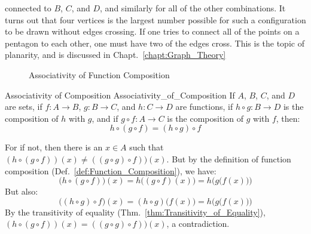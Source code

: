         connected to $B$, $C$, and $D$, and similarly for all of the other
        combinations. It turns out that four vertices is the largest number
        possible for such a configuration to be drawn without edges crossing.
        If one tries to connect all of the points on a pentagon to each other,
        one must have two of the edges cross. This is the topic of planarity,
        and is discussed in Chapt.~\ref{chapt:Graph_Theory}
        \begin{figure}[H]
            \centering
            \captionsetup{type=figure}
            
            \caption{Associativity of Function Composition}
            \label{fig:Associativity_of_Function_Comp}
        \end{figure}
        \begin{ftheorem}{Associativity of Composition}
                        {Associativity_of_Composition}
            If $A$, $B$, $C$, and $D$ are sets, if $f:A\rightarrow{B}$,
            $g:B\rightarrow{C}$, and $h:C\rightarrow{D}$ are functions, if
            $h\circ{g}:B\rightarrow{D}$ is the composition of $h$ with $g$, and
            if $g\circ{f}:A\rightarrow{C}$ is the composition of $g$ with $f$,
            then:
            \begin{equation*}
                h\circ(g\circ{f})=(h\circ{g})\circ{f}
            \end{equation*}
        \end{ftheorem}
        \begin{bproof}
            For if not, then there is an $x\in{A}$ such that
            $(h\circ(g\circ{f}))(x)\ne((g\circ{g})\circ{f}))(x)$. But by the
            definition of function composition
            (Def.~\ref{def:Function_Composition}), we have:
            \begin{equation}
                \big(h\circ(g\circ{f})\big)(x)
                =h\big((g\circ{f})(x)\big)
                =h\Big(g\big(f(x)\big)\Big)
            \end{equation}
            But also:
            \begin{equation}
                \big((h\circ{g})\circ{f}\big)(x)
                =(h\circ{g})\big(f(x)\big)
                =h\Big(g\big(f(x)\big)\Big)
            \end{equation}
            By the transitivity of equality 
            (Thm.~\ref{thm:Transitivity_of_Equality}),
            $(h\circ(g\circ{f}))(x)=((g\circ{g})\circ{f}))(x)$, a contradiction.
        \end{bproof}
